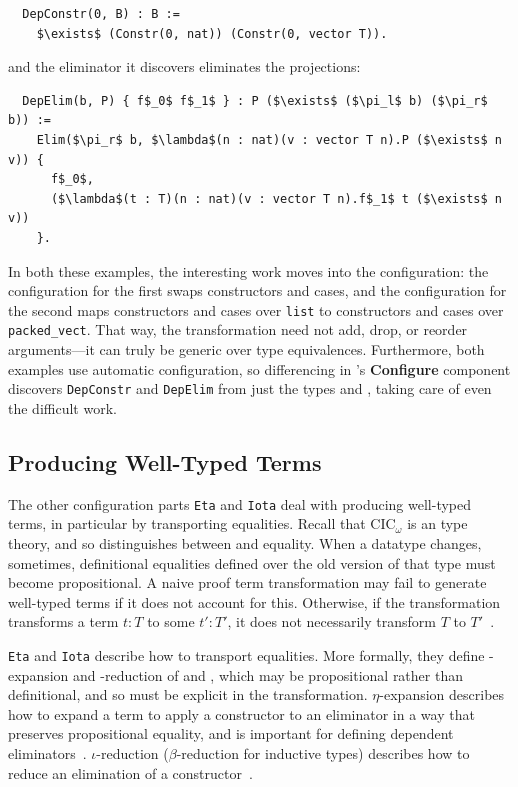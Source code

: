 \begin{lstlisting}
  DepConstr(0, B) : B :=
    $\exists$ (Constr(0, nat)) (Constr(0, vector T)).
\end{lstlisting}
and the eliminator it discovers eliminates the projections:

\begin{lstlisting}
  DepElim(b, P) { f$_0$ f$_1$ } : P ($\exists$ ($\pi_l$ b) ($\pi_r$ b)) :=
    Elim($\pi_r$ b, $\lambda$(n : nat)(v : vector T n).P ($\exists$ n v)) {
      f$_0$,
      ($\lambda$(t : T)(n : nat)(v : vector T n).f$_1$ t ($\exists$ n v))
    }.
\end{lstlisting}

In both these examples, the interesting work moves into the configuration:
the configuration for the first swaps constructors and cases,
and the configuration for the second maps constructors and cases over \lstinline{list} to constructors and cases over \lstinline{packed_vect}. %
That way, the transformation need not add, drop, or reorder arguments---it can truly be generic over type equivalences.
Furthermore, both examples use automatic configuration, so differencing in \toolnamec's \textbf{Configure} component
discovers \lstinline{DepConstr} and \lstinline{DepElim} from just the types \Aa and \B, taking care of even the difficult work.

\subsection{Producing Well-Typed Terms}
\label{sec:pi-diff-equal}

The other configuration parts \lstinline{Eta} and \lstinline{Iota} deal with producing well-typed terms,
in particular by transporting equalities.
Recall that CIC$_{\omega}$ is an  type theory,
and so distinguishes between  and  equality.
When a datatype changes, sometimes, definitional equalities defined over the old version of that type must become propositional.
A naive proof term transformation may fail to generate well-typed terms if it does not account for this.
Otherwise, if the transformation transforms a term $t : T$ to some $t' : T'$, it does not necessarily
transform $T$ to $T'$~\cite{tabareau2019marriage}.

\lstinline{Eta} and \lstinline{Iota} describe how to transport equalities.
More formally, they define \intro{$\eta$}-expansion and \intro{$\iota$}-reduction of \Aa and \B,
which may be propositional rather than definitional,
and so must be explicit in the transformation.
$\eta$-expansion describes how to expand a term to apply a constructor to an eliminator in a way that preserves propositional equality,
and is important for defining dependent eliminators~\cite{nlab:eta-conversion}.
$\iota$-reduction ($\beta$-reduction for inductive types) describes how to reduce an elimination of a constructor~\cite{nlab:beta-reduction}.


